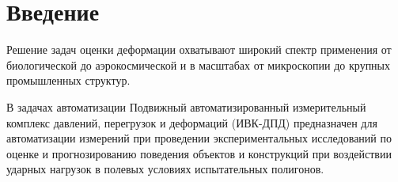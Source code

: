 \setcounter{figure}{0}
\newpage
\section*{Введение}

Решение задач оценки деформации охватывают широкий спектр применения от биологической до аэрокосмической и в масштабах от микроскопии до крупных промышленных структур. %

В задачах автоматизации 
Подвижный автоматизированный измерительный комплекс давлений, перегрузок и деформаций (ИВК-ДПД) предназначен для автоматизации измерений при проведении экспериментальных исследований по оценке и прогнозированию поведения объектов и конструкций при воздействии ударных нагрузок в полевых условиях испытательных полигонов.

